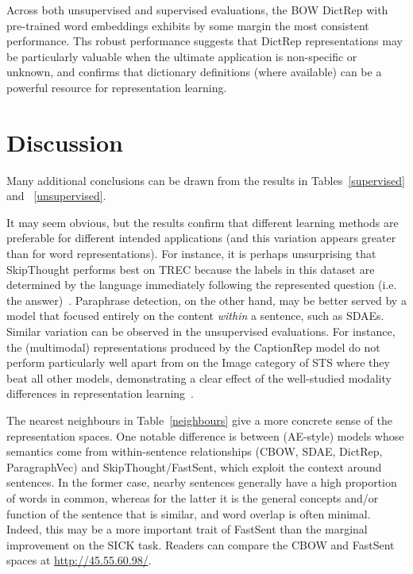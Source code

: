 Across both unsupervised and supervised evaluations, the BOW DictRep with pre-trained word embeddings exhibits by some margin the most consistent performance. Ths robust performance suggests that DictRep representations may be particularly valuable when the ultimate application is non-specific or unknown, and confirms that dictionary definitions (where available) can be a powerful resource for representation learning.  

\section{Discussion}


Many additional conclusions can be drawn from the results in Tables~\ref{supervised} and ~\ref{unsupervised}. 

\vspace{5pt} It may seem obvious, but the results confirm that different learning methods are preferable for different intended applications (and this variation appears greater than for word representations). For instance, it is perhaps unsurprising that SkipThought performs best on TREC because the labels in this dataset are determined by the language immediately following the represented question (i.e. the answer)~\citep{voorhees2002overview}. Paraphrase detection, on the other hand, may be better served by a model that focused entirely on the content \emph{within} a sentence, such as SDAEs. Similar variation can be observed in the unsupervised evaluations. For instance, the (multimodal) representations produced by the CaptionRep model do not perform particularly well apart from on the Image category of STS where they beat all other models, demonstrating a clear effect of the well-studied modality differences in representation learning~\citep{bruni2014multimodal}. 

The nearest neighbours in Table~\ref{neighbours} give a more concrete sense of the representation spaces. One notable difference is between (AE-style) models whose semantics come from within-sentence relationships (CBOW, SDAE, DictRep, ParagraphVec) and SkipThought/FastSent, which exploit the context around sentences. In the former case, nearby sentences generally have a high proportion of words in common, whereas for the latter it is the general concepts and/or function of the sentence that is similar, and word overlap is often minimal. Indeed, this may be a more important trait of FastSent than the marginal improvement on the SICK task. Readers can compare the CBOW and FastSent spaces at \url{http://45.55.60.98/}.

